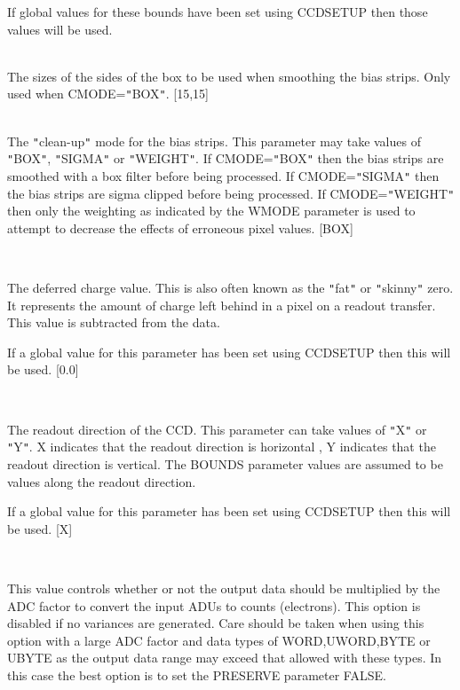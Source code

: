 \documentclass[twoside,11pt]{article}
\newcommand{\htmlref}[2]{#1}
\renewcommand{\_}{\texttt{\symbol{95}}}
\newcommand{\qt}[1]{{\tt "}#1{\tt "}}
\newcommand{\xroutine}[1]{\htmlref{{\sc #1}}{#1}}
\newcommand{\sstsubsection}[1]{ \item[{#1}] \mbox{} \\}
\newcommand{\sstsubsection}[1]{\item[{#1}]}
\begin{document}
{{{         If global values for these bounds have been set using
         \xroutine{CCDSETUP} then those values will be used.
      }
      \sstsubsection{
         BOXSIZE( 2 ) = \_INTEGER (Read)
      } {
         The sizes of the sides of the box to be used when smoothing the
         bias strips. Only used when CMODE=\qt{BOX}.
         [15,15]
      }
      \sstsubsection{
         CMODE = LITERAL (Read)
      } {
         The \qt{clean-up} mode for the bias strips. This parameter may
         take values of \qt{BOX}, \qt{SIGMA} or \qt{WEIGHT}.
         If CMODE=\qt{BOX} then
         the bias strips are smoothed with a box filter before being
         processed. If CMODE=\qt{SIGMA} then the bias strips are sigma
         clipped before being processed. If CMODE=\qt{WEIGHT} then only
         the weighting as indicated by the WMODE parameter is used to
         attempt to decrease the effects of erroneous pixel values.
         [BOX]
      }
      \sstsubsection{
         DEFERRED = \_DOUBLE (Read)
      } {
         The deferred charge value. This is also often known as the
         \qt{fat} or \qt{skinny} zero. It represents the amount of charge
         left behind in a pixel on a readout transfer. This value is
         subtracted from the data.

         If a global value for this parameter has been set using
         \xroutine{CCDSETUP} then this will be used.
         [0.0]
      }
      \sstsubsection{
         DIRECTION = LITERAL (Read)
      } {
         The readout direction of the CCD. This parameter can take
         values of \qt{X} or \qt{Y}. X indicates that the readout direction is
         horizontal , Y indicates that the readout direction is
         vertical. The BOUNDS parameter values are assumed to be values
         along the readout direction.

         If a global value for this parameter has been set using
         \xroutine{CCDSETUP} then this will be used.
         [X]
      }
      \sstsubsection{
         EXPAND = \_LOGICAL (Read)
      } {
         This value controls whether or not the output data should be
         multiplied by the ADC factor to convert the input ADUs to
         counts (electrons). This option is disabled if no variances
         are generated. Care should be taken when using this option
         with a large ADC factor and data types of \_WORD,\_UWORD,\_BYTE
         or \_UBYTE as the output data range may exceed that allowed
         with these types. In this case the best option is to set
         the PRESERVE parameter FALSE.

}}}
\end{document}
